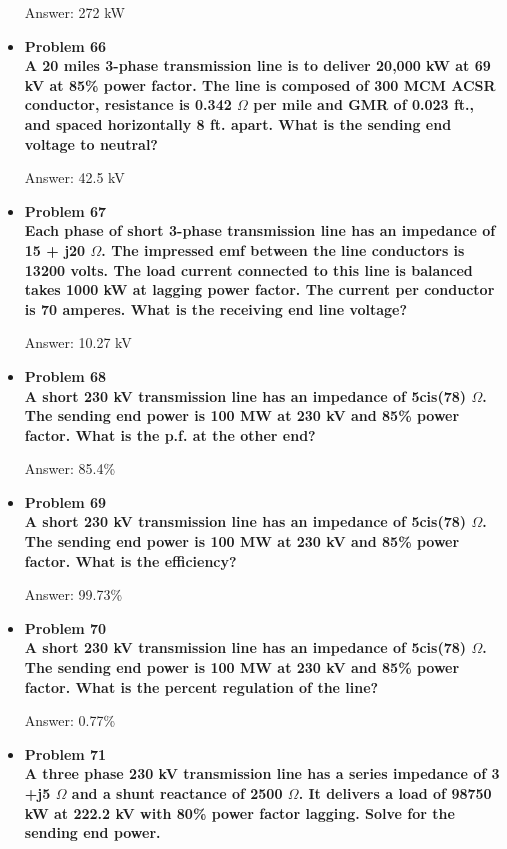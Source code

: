 \documentclass{article}
\begin{document}
\begin{center}
\begin{itemize}
    Answer: 272 kW

    \item\textbf{Problem 66\\%
    A 20 miles 3-phase transmission line is to deliver 20,000 kW at 69 kV at 85\% power factor. The line is composed of 300 MCM ACSR conductor, resistance is 0.342 $\Omega$ per mile and GMR of 0.023 ft., and spaced horizontally 8 ft. apart. What is the sending end voltage to neutral?}

    Answer: 42.5 kV

    \item\textbf{Problem 67\\%
    Each phase of short 3-phase transmission line has an impedance of 15 + j20 $\Omega$. The impressed emf between the line conductors is 13200 volts. The load current connected to this line is balanced takes 1000 kW at lagging power factor. The current per conductor is 70 amperes. What is the receiving end line voltage?}

    Answer: 10.27 kV

    \item\textbf{Problem 68\\%
    A short 230 kV transmission line has an impedance of 5cis(78) $\Omega$. The sending end power is 100 MW at 230 kV and 85\% power factor. What is the p.f. at the other end?}

    Answer: 85.4\%

    \item\textbf{Problem 69\\%
    A short 230 kV transmission line has an impedance of 5cis(78) $\Omega$. The sending end power is 100 MW at 230 kV and 85\% power factor. What is the efficiency?}

    Answer: 99.73\%

    \item \textbf{Problem 70\\%
    A short 230 kV transmission line has an impedance of 5cis(78) $\Omega$. The sending end power is 100 MW at 230 kV and 85\% power factor. What is the percent regulation of the line?}

    Answer: 0.77\%

    \item\textbf{Problem 71\\%
    A three phase 230 kV transmission line has a series impedance of 3 +j5 $\Omega$ and a shunt reactance of 2500 $\Omega$. It delivers a load of 98750 kW at 222.2 kV with 80\% power factor lagging. Solve for the sending end power.}


\end{itemize}
\end{center}
\end{document}

